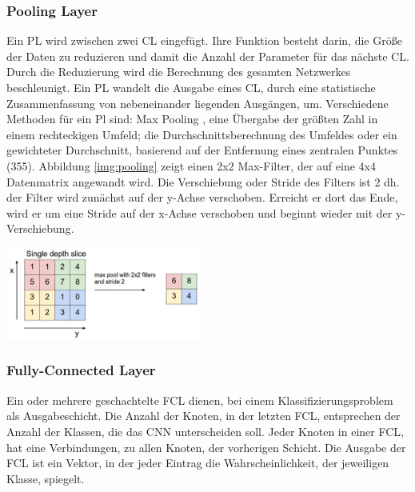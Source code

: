 \documentclass[twosided,a4,10pt]{article}
\begin{document}
\begin{multicols}{2}
		\subsubsection*{Pooling Layer}
		Ein PL wird zwischen zwei CL eingefügt. Ihre Funktion besteht darin, die Größe der Daten zu reduzieren und damit die Anzahl der Parameter für das nächste CL. Durch die Reduzierung wird die Berechnung des gesamten Netzwerkes beschleunigt. \cite{karpathy}\newline Ein PL wandelt die Ausgabe eines CL, durch eine statistische Zusammenfassung von nebeneinander liegenden Ausgängen, um. Verschiedene Methoden für ein Pl sind: Max Pooling \cite{zhou}, eine Übergabe der größten Zahl in einem rechteckigen Umfeld; die Durchschnittsberechnung des Umfeldes oder ein gewichteter Durchschnitt, basierend auf der Entfernung eines zentralen Punktes \cite{goodfellow}(355).\newline
		Abbildung \ref{img:pooling} zeigt einen 2x2 Max-Filter, der auf eine 4x4 Datenmatrix angewandt wird. Die Verschiebung oder Stride des Filters ist 2 dh. der Filter wird zunächst auf der y-Achse verschoben. Erreicht er dort das Ende, wird er um eine Stride auf der x-Achse verschoben und beginnt wieder mit der y-Verschiebung.\newline\\
		\begin{minipage}{0.4\textwidth}
			\centering
			\includegraphics{img/pooling.png}
			\label{img:pooling}
		\end{minipage}\newline
		\subsubsection*{Fully-Connected Layer}
		Ein oder mehrere geschachtelte FCL dienen, bei einem Klassifizierungsproblem als Ausgabeschicht. Die Anzahl der Knoten, in der letzten FCL, entsprechen der Anzahl der Klassen, die das CNN unterscheiden soll.
		Jeder Knoten in einer FCL, hat eine Verbindungen, zu allen Knoten, der vorherigen Schicht. Die Ausgabe der FCL ist ein Vektor, in der jeder Eintrag die Wahrscheinlichkeit, der jeweiligen Klasse, spiegelt. \cite{karpathy}

\end{multicols}
\end{document}
